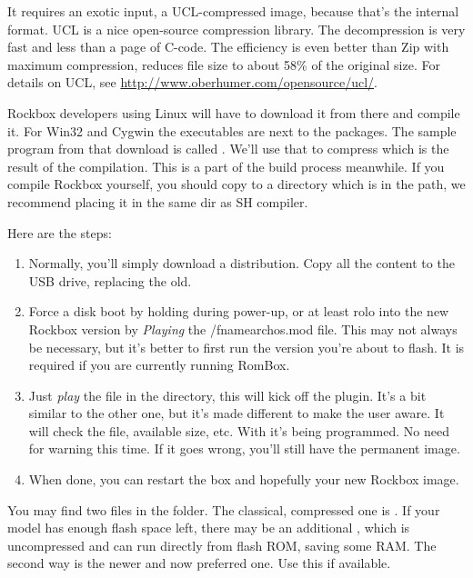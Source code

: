 It requires an exotic input, a UCL-compressed image, because that's the internal 
format. UCL is a nice open-source compression library. The decompression is very 
fast and less than a page of C-code. The efficiency is even better than Zip with 
maximum compression, reduces file size to about 58\% of the original size. For 
details on UCL, see \url{http://www.oberhumer.com/opensource/ucl/}.

Rockbox developers using Linux will have to download it from there and compile 
it. For Win32 and Cygwin the executables are next to the packages. The sample 
program from that download is called . We'll use that to compress 
 which is the result of the compilation. This is a part of the
build process meanwhile. If you compile Rockbox yourself, you should copy 
 to a directory which is in the path, we recommend placing it in 
the same dir as SH compiler.


Here are the steps:

\begin{enumerate}
\item Normally, you'll simply download a  distribution. Copy all the 
  content to the USB drive, replacing the old.
\item Force a disk boot by holding  during power-up, or at least rolo into
  the new Rockbox version by \emph{Playing} the /fname{archos.mod} file. This may not always be necessary, but it's better to first run the 
  version you're about to flash. It is required if you are currently running 
  RomBox.
\item Just \emph{play} the  file in the  directory, 
  this will kick off the  plugin. It's a bit similar 
  to the other one, but it's made different to make the user aware. It will check
  the file, available size, etc. With  it's being programmed. No need for 
  warning this time. If it goes wrong, you'll still have the permanent image.
\item When done, you can restart the box and hopefully your new Rockbox image.
\end{enumerate}

You may find two  files in the  folder. The 
classical, compressed one is . If your model has enough flash 
space left, there may be an additional , which is uncompressed 
and can run directly from flash ROM, saving some RAM. The second way is the newer
and now preferred one. Use this if available.

